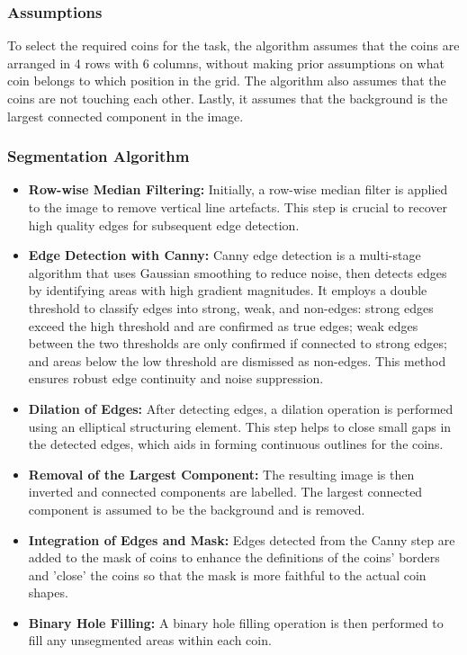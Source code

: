 \documentclass[11pt]{article}
\begin{document}
\subsubsection{Assumptions}
To select the required coins for the task, the algorithm assumes that the coins are arranged in 4 rows with 6 columns, without making prior assumptions on what coin belongs to which position in the grid. The algorithm also assumes that the coins are not touching each other. Lastly, it assumes that the background is the largest connected component in the image.
\subsubsection{Segmentation Algorithm}

\begin{itemize}
\item \textbf{Row-wise Median Filtering:} Initially, a row-wise median filter is applied to the image to remove vertical line artefacts. This step is crucial to recover high quality edges for subsequent edge detection.
\item \textbf{Edge Detection with Canny:} Canny edge detection is a multi-stage algorithm that uses Gaussian smoothing to reduce noise, then detects edges by identifying areas with high gradient magnitudes. It employs a double threshold to classify edges into strong, weak, and non-edges: strong edges exceed the high threshold and are confirmed as true edges; weak edges between the two thresholds are only confirmed if connected to strong edges; and areas below the low threshold are dismissed as non-edges. This method ensures robust edge continuity and noise suppression.
\item \textbf{Dilation of Edges:} After detecting edges, a dilation operation is performed using an elliptical structuring element. This step helps to close small gaps in the detected edges, which aids in forming continuous outlines for the coins.
\item \textbf{Removal of the Largest Component:} The resulting image is then inverted and connected components are labelled. The largest connected component is assumed to be the background and is removed.
\item \textbf{Integration of Edges and Mask:} Edges detected from the Canny step are added to the mask of coins to enhance the definitions of the coins' borders and 'close' the coins so that the mask is more faithful to the actual coin shapes.
\item \textbf{Binary Hole Filling:} A binary hole filling operation is then performed to fill any unsegmented areas within each coin. 

\end{itemize}
\end{document}
